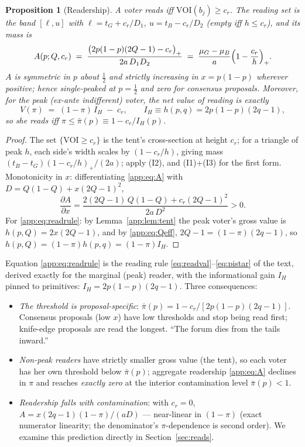 \documentclass[12pt]{article}
\newtheorem{proposition}{Proposition}
\begin{document}
\begin{proposition}[Readership]\label{app:prop:readership}
A voter reads iff $\mathrm{VOI}(b_j)\ge c_r$. The reading set is the band
$[\ell,u]$ with $\ell=t_G+c_r/D_1$, $u=t_B-c_r/D_2$ (empty iff $h\le c_r$), and
its mass is
\begin{equation}\label{app:eq:A}
A(p;Q,c_r)\;=\;\frac{\bigl(2p(1-p)(2Q-1)-c_r\bigr)_+}{2a\,D_1D_2}
\;=\;\frac{\mu_G-\mu_B}{a}\Bigl(1-\frac{c_r}{h}\Bigr)_+ .
\end{equation}
$A$ is symmetric in $p$ about $\tfrac12$ and strictly increasing in $x=p(1-p)$
wherever positive; hence single-peaked at $p=\tfrac12$ and zero for consensus
proposals. Moreover, for the peak (ex-ante indifferent) voter, the net value of
reading is \emph{exactly}
\begin{equation}\label{app:eq:readrule}
V(\pi)\;=\;(1-\pi)\,I_H\;-\;c_r,\qquad I_H\equiv h(p,q)=2p(1-p)(2q-1),
\end{equation}
so she reads iff $\pi\le \bar\pi(p)\equiv 1-c_r/I_H(p)$.
\end{proposition}

\begin{proof}
The set $\{\mathrm{VOI}\ge c_r\}$ is the tent's cross-section at height $c_r$;
for a triangle of peak $h$, each side's width scales by $(1-c_r/h)$, giving mass
$(t_B-t_G)(1-c_r/h)_+/(2a)$; apply (I2), and (I1)+(I3) for the first form.
Monotonicity in $x$: differentiating \eqref{app:eq:A} with $D=Q(1-Q)+x(2Q-1)^2$,
\[
\frac{\partial A}{\partial x}
=\frac{2(2Q-1)\,Q(1-Q)+c_r(2Q-1)^2}{2a\,D^2}>0 .
\]
For \eqref{app:eq:readrule}: by Lemma~\ref{app:lem:tent} the peak voter's gross value is
$h(p,Q)=2x(2Q-1)$, and by \eqref{app:eq:Qeff}, $2Q-1=(1-\pi)(2q-1)$, so
$h(p,Q)=(1-\pi)h(p,q)=(1-\pi)I_H$.
\end{proof}

Equation \eqref{app:eq:readrule} is the reading rule \eqref{eq:readval}--\eqref{eq:pistar} of the text, derived exactly for the marginal (peak) reader, with the informational gain $I_H$ pinned to primitives: $I_H=2p(1-p)(2q-1)$. Three consequences:
\begin{itemize}[itemsep=1pt]
\item \emph{The threshold is proposal-specific}: $\bar\pi(p)=1-c_r/[2p(1-p)(2q-1)]$.
Consensus proposals (low $x$) have low thresholds and stop being read first;
knife-edge proposals are read the longest. ``The forum dies from the tails
inward.''
\item \emph{Non-peak readers} have strictly smaller gross value (the tent), so
each voter has her own threshold below $\bar\pi(p)$; aggregate readership
\eqref{app:eq:A} declines in $\pi$ and reaches \emph{exactly zero} at the interior
contamination level $\bar\pi(p)<1$.
\item \emph{Readership falls with contamination}: with $c_r=0$,
$A=x(2q-1)(1-\pi)/(aD)$ --- near-linear in $(1-\pi)$ (exact numerator linearity;
the denominator's $\pi$-dependence is second order). We examine this prediction directly in Section~\ref{sec:reads}.
\end{itemize}
\end{document}
